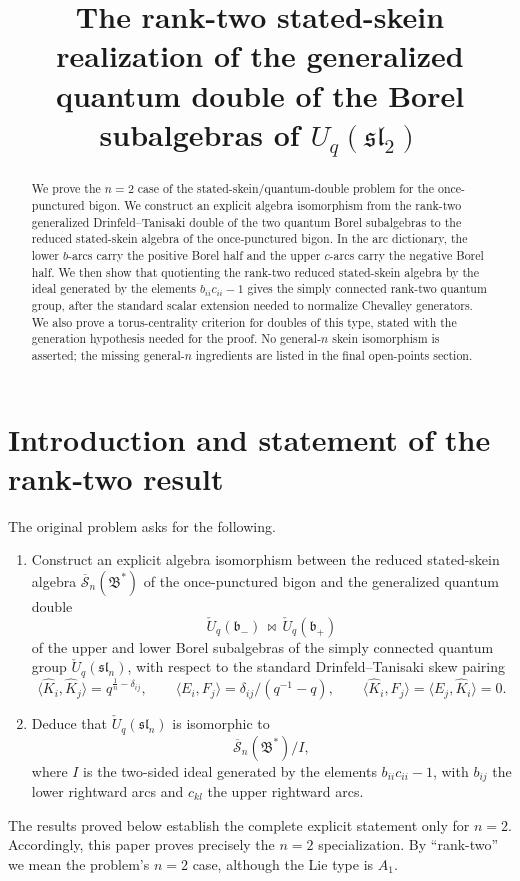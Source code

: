 \documentclass[12pt]{article}
\theoremstyle{plain}
\theoremstyle{definition}
\numberwithin{equation}{section}
\newcommand{\hS}{\overline{\mathscr{S}}}
\newcommand{\bipr}{\bowtie}         %
\begin{document}
\title{The rank-two stated-skein realization of the generalized quantum double of the Borel subalgebras of \(U_q(\mathfrak{sl}_2)\)}
\author{}
\date{}
\maketitle

\begin{abstract}
We prove the \(n=2\) case of the stated-skein/quantum-double problem for the once-punctured bigon.  We construct an explicit algebra isomorphism from the rank-two generalized Drinfeld--Tanisaki double of the two quantum Borel subalgebras to the reduced stated-skein algebra of the once-punctured bigon.  In the arc dictionary, the lower \(b\)-arcs carry the positive Borel half and the upper \(c\)-arcs carry the negative Borel half.  We then show that quotienting the rank-two reduced stated-skein algebra by the ideal generated by the elements \(b_{ii}c_{ii}-1\) gives the simply connected rank-two quantum group, after the standard scalar extension needed to normalize Chevalley generators.  We also prove a torus-centrality criterion for doubles of this type, stated with the generation hypothesis needed for the proof.  No general-\(n\) skein isomorphism is asserted; the missing general-\(n\) ingredients are listed in the final open-points section.
\end{abstract}

\section{Introduction and statement of the rank‑two result}
\label{sec:intro}

The original problem asks for the following.

\begin{enumerate}[label=(\arabic*)]
\item Construct an explicit algebra isomorphism between the reduced stated-skein algebra \(\hS_n(\mathfrak B^*)\) of the once-punctured bigon and the generalized quantum double
\[
\check U_q(\mathfrak b_-)\,\bipr\,\check U_q(\mathfrak b_+)
\]
of the upper and lower Borel subalgebras of the simply connected quantum group \(\check U_q(\mathfrak{sl}_n)\), with respect to the standard Drinfeld--Tanisaki skew pairing
\[
\langle \widehat K_i,\widehat K_j\rangle
=
q^{\frac1n-\delta_{ij}},
\qquad
\langle E_i,F_j\rangle
=
\delta_{ij}/(q^{-1}-q),
\qquad
\langle \widehat K_i,F_j\rangle
=
\langle E_j,\widehat K_i\rangle
=
0.
\]
\item Deduce that \(\check U_q(\mathfrak{sl}_n)\) is isomorphic to
\[
\hS_n(\mathfrak B^*)/I,
\]
where \(I\) is the two-sided ideal generated by the elements \(b_{ii}c_{ii}-1\), with \(b_{ij}\) the lower rightward arcs and \(c_{kl}\) the upper rightward arcs.
\end{enumerate}
The results proved below establish the complete explicit statement only for \(n=2\).  Accordingly, this paper proves precisely the \(n=2\) specialization.  By ``rank-two'' we mean the problem's \(n=2\) case, although the Lie type is \(A_1\).
\end{document}
